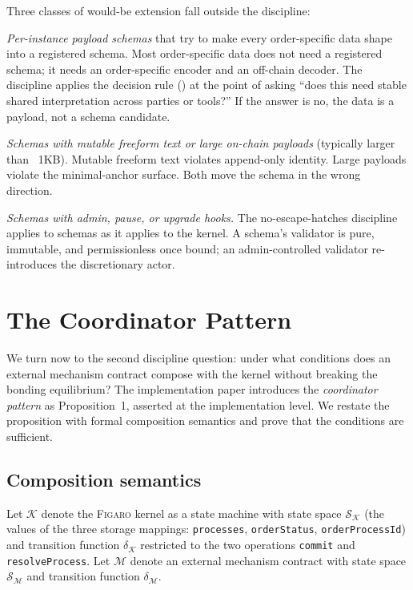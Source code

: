\documentclass[11pt,a4paper]{article}
\theoremstyle{definition}
\theoremstyle{remark}
\newcommand{\figaro}{\textsc{Figaro}}
\begin{document}
Three classes of would-be extension fall outside the discipline:

\emph{Per-instance payload schemas} that try to make every
order-specific data shape into a registered schema. Most
order-specific data does not need a registered schema; it needs an
order-specific encoder and an off-chain decoder. The discipline
applies the decision rule () at the
point of asking ``does this need stable shared interpretation
across parties or tools?'' If the answer is no, the data is a
payload, not a schema candidate.

\emph{Schemas with mutable freeform text or large on-chain
payloads} (typically larger than ~1KB). Mutable freeform text
violates append-only identity. Large payloads violate the
minimal-anchor surface. Both move the schema in the wrong direction.

\emph{Schemas with admin, pause, or upgrade hooks.} The
no-escape-hatches discipline applies to schemas as it applies to
the kernel. A schema's validator is pure, immutable, and
permissionless once bound; an admin-controlled validator
re-introduces the discretionary actor.

\section{The Coordinator Pattern}
\label{sec:coordinator}

We turn now to the second discipline question: under what conditions
does an external mechanism contract compose with the kernel without
breaking the bonding equilibrium? The implementation paper introduces
the \emph{coordinator pattern} as Proposition~1, asserted at the
implementation level. We restate the proposition with formal
composition semantics and prove that the conditions are sufficient.

\subsection{Composition semantics}

Let $\mathcal{K}$ denote the \figaro{} kernel as a state machine with
state space $\mathcal{S}_{\mathcal{K}}$ (the values of the three
storage mappings: \texttt{processes}, \texttt{orderStatus},
\texttt{orderProcessId}) and transition function $\delta_{\mathcal{K}}$
restricted to the two operations \texttt{commit} and
\texttt{resolveProcess}. Let $\mathcal{M}$ denote an external
mechanism contract with state space $\mathcal{S}_{\mathcal{M}}$ and
transition function $\delta_{\mathcal{M}}$.
\end{document}
